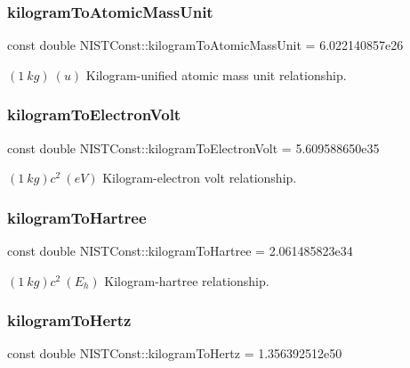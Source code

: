 \subsubsection{\texorpdfstring{kilogram\+To\+Atomic\+Mass\+Unit}{kilogramToAtomicMassUnit}}
{\footnotesize\ttfamily const double N\+I\+S\+T\+Const\+::kilogram\+To\+Atomic\+Mass\+Unit = 6.\+022140857e26}

$(1\ kg)\ (u)$ Kilogram-\/unified atomic mass unit relationship. \mbox{\label{group___n_i_s_t_const-_kilogram_gae0d25d28f6a0596f2dd5f8b3dc5ebb38}} 
\subsubsection{\texorpdfstring{kilogram\+To\+Electron\+Volt}{kilogramToElectronVolt}}
{\footnotesize\ttfamily const double N\+I\+S\+T\+Const\+::kilogram\+To\+Electron\+Volt = 5.\+609588650e35}

$(1\ kg)c^2 \ (eV)$ Kilogram-\/electron volt relationship. \mbox{\label{group___n_i_s_t_const-_kilogram_gaa1f73e0db10cccf2a4c86dbd360e49a8}} 
\subsubsection{\texorpdfstring{kilogram\+To\+Hartree}{kilogramToHartree}}
{\footnotesize\ttfamily const double N\+I\+S\+T\+Const\+::kilogram\+To\+Hartree = 2.\+061485823e34}

$(1\ kg)c^2 \ (E_h)$ Kilogram-\/hartree relationship. \mbox{\label{group___n_i_s_t_const-_kilogram_gaf543ce948a71df1884a8f240106c3c33}} 
\subsubsection{\texorpdfstring{kilogram\+To\+Hertz}{kilogramToHertz}}
{\footnotesize\ttfamily const double N\+I\+S\+T\+Const\+::kilogram\+To\+Hertz = 1.\+356392512e50}


